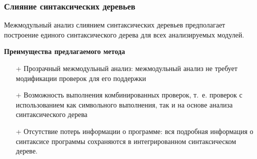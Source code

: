 \documentclass[10pt,gray]{beamer}
\begin{document}
\begin{frame}
\frametitle{Слияние синтаксических деревьев}
Межмодульный анализ слиянием синтаксических деревьев предполагает построение единого синтаксического дерева для всех анализируемых модулей.
\vspace{10pt}

\textbf{Преимущества предлагаемого метода}
\begin{itemize}
 \item[+] Прозрачный межмодульный анализ: межмодульный анализ не требует модификации проверок для его поддержки
 \item[+] Возможность выполнения комбинированных проверок, т.~е. проверок с использованием как символьного выполнения, так и на основе анализа синтаксического дерева
 \item[+] Отсутствие потерь информации о программе: вся подробная информация о синтаксисе программы сохраняются в интегрированном синтаксическом дереве.
\end{itemize}
\end{frame}

\end{document}
